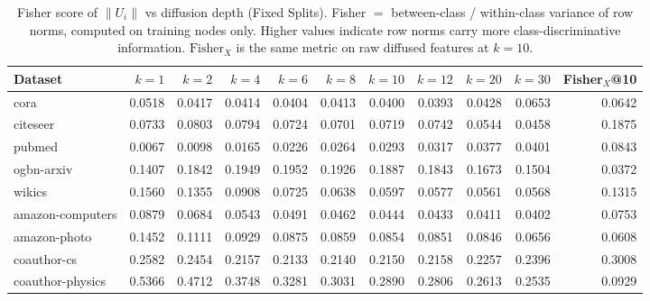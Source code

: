 \begin{table}[t]
\centering\small\setlength{\tabcolsep}{5pt}
\caption{Fisher score of $\|U_i\|$ vs diffusion depth (Fixed Splits). Fisher $=$ between-class / within-class variance of row norms, computed on training nodes only. Higher values indicate row norms carry more class-discriminative information. $\text{Fisher}_X$ is the same metric on raw diffused features at $k=10$.}
\label{tab:fisher_vs_k_fixed}
\begin{tabular}{lrrrrrrrrrr}
\toprule
Dataset & $k=1$ & $k=2$ & $k=4$ & $k=6$ & $k=8$ & $k=10$ & $k=12$ & $k=20$ & $k=30$ & Fisher$_X$@10 \\
\midrule
cora & 0.0518 & 0.0417 & 0.0414 & 0.0404 & 0.0413 & 0.0400 & 0.0393 & 0.0428 & 0.0653 & 0.0642 \\
citeseer & 0.0733 & 0.0803 & 0.0794 & 0.0724 & 0.0701 & 0.0719 & 0.0742 & 0.0544 & 0.0458 & 0.1875 \\
pubmed & 0.0067 & 0.0098 & 0.0165 & 0.0226 & 0.0264 & 0.0293 & 0.0317 & 0.0377 & 0.0401 & 0.0843 \\
ogbn\mbox{-}arxiv & 0.1407 & 0.1842 & 0.1949 & 0.1952 & 0.1926 & 0.1887 & 0.1843 & 0.1673 & 0.1504 & 0.0372 \\
wikics & 0.1560 & 0.1355 & 0.0908 & 0.0725 & 0.0638 & 0.0597 & 0.0577 & 0.0561 & 0.0568 & 0.1315 \\
amazon\mbox{-}computers & 0.0879 & 0.0684 & 0.0543 & 0.0491 & 0.0462 & 0.0444 & 0.0433 & 0.0411 & 0.0402 & 0.0753 \\
amazon\mbox{-}photo & 0.1452 & 0.1111 & 0.0929 & 0.0875 & 0.0859 & 0.0854 & 0.0851 & 0.0846 & 0.0656 & 0.0608 \\
coauthor\mbox{-}cs & 0.2582 & 0.2454 & 0.2157 & 0.2133 & 0.2140 & 0.2150 & 0.2158 & 0.2257 & 0.2396 & 0.3008 \\
coauthor\mbox{-}physics & 0.5366 & 0.4712 & 0.3748 & 0.3281 & 0.3031 & 0.2890 & 0.2806 & 0.2613 & 0.2535 & 0.0929 \\
\bottomrule\end{tabular}\end{table}